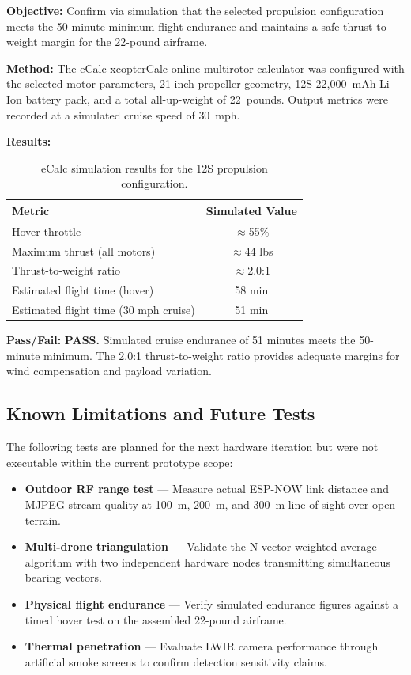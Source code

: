 \documentclass[journal, onecolumn]{IEEEtran}
\begin{document}
\textbf{Objective:} Confirm via simulation that the selected propulsion configuration meets the 50-minute minimum flight endurance and maintains a safe thrust-to-weight margin for the 22-pound airframe.

\textbf{Method:} The eCalc xcopterCalc online multirotor calculator was configured with the selected motor parameters, 21-inch propeller geometry, 12S 22,000~mAh Li-Ion battery pack, and a total all-up-weight of 22~pounds. Output metrics were recorded at a simulated cruise speed of 30~mph.

\textbf{Results:}
\begin{table}[H]
\centering
\small
\begin{tabular}{|l|c|}
\hline
\textbf{Metric} & \textbf{Simulated Value} \\
\hline
Hover throttle & $\approx$55\% \\
\hline
Maximum thrust (all motors) & $\approx$44 lbs \\
\hline
Thrust-to-weight ratio & $\approx$2.0:1 \\
\hline
Estimated flight time (hover) & 58 min \\
\hline
Estimated flight time (30 mph cruise) & 51 min \\
\hline
\end{tabular}
\caption{eCalc simulation results for the 12S propulsion configuration.}
\end{table}

\textbf{Pass/Fail:} \textbf{PASS.} Simulated cruise endurance of 51 minutes meets the 50-minute minimum. The 2.0:1 thrust-to-weight ratio provides adequate margins for wind compensation and payload variation.

\subsection{Known Limitations and Future Tests}

The following tests are planned for the next hardware iteration but were not executable within the current prototype scope:
\begin{itemize}
    \item \textbf{Outdoor RF range test} — Measure actual ESP-NOW link distance and MJPEG stream quality at 100~m, 200~m, and 300~m line-of-sight over open terrain.
    \item \textbf{Multi-drone triangulation} — Validate the N-vector weighted-average algorithm with two independent hardware nodes transmitting simultaneous bearing vectors.
    \item \textbf{Physical flight endurance} — Verify simulated endurance figures against a timed hover test on the assembled 22-pound airframe.
    \item \textbf{Thermal penetration} — Evaluate LWIR camera performance through artificial smoke screens to confirm detection sensitivity claims.
\end{itemize}
\end{document}
